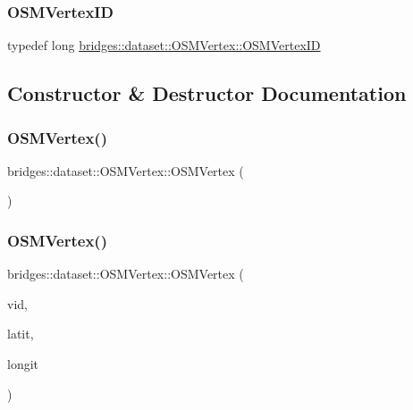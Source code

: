 \subsubsection{\texorpdfstring{OSMVertexID}{OSMVertexID}}
{\footnotesize\ttfamily typedef long \mbox{\hyperlink{classbridges_1_1dataset_1_1_o_s_m_vertex_ad166f13b0aefbdc05a273546f2a3bb96}{bridges\+::dataset\+::\+O\+S\+M\+Vertex\+::\+O\+S\+M\+Vertex\+ID}}}



\subsection{Constructor \& Destructor Documentation}
\mbox{\label{classbridges_1_1dataset_1_1_o_s_m_vertex_aa5d6ef7aef3bb762665aa6ab3a2658f6}} 
\subsubsection{\texorpdfstring{OSMVertex()}{OSMVertex()}\hspace{0.1cm}{\footnotesize\ttfamily [1/3]}}
{\footnotesize\ttfamily bridges\+::dataset\+::\+O\+S\+M\+Vertex\+::\+O\+S\+M\+Vertex (\begin{DoxyParamCaption}{ }\end{DoxyParamCaption})\hspace{0.3cm}{\ttfamily [inline]}}

\mbox{\label{classbridges_1_1dataset_1_1_o_s_m_vertex_a9ad9739ae1da536fe5e66b2f07b8ba1d}} 
\subsubsection{\texorpdfstring{OSMVertex()}{OSMVertex()}\hspace{0.1cm}{\footnotesize\ttfamily [2/3]}}
{\footnotesize\ttfamily bridges\+::dataset\+::\+O\+S\+M\+Vertex\+::\+O\+S\+M\+Vertex (\begin{DoxyParamCaption}\item[{\mbox{\hyperlink{classbridges_1_1dataset_1_1_o_s_m_vertex_ad166f13b0aefbdc05a273546f2a3bb96}{O\+S\+M\+Vertex\+ID}}}]{vid,  }\item[{double}]{latit,  }\item[{double}]{longit }\end{DoxyParamCaption})\hspace{0.3cm}{\ttfamily [inline]}}

